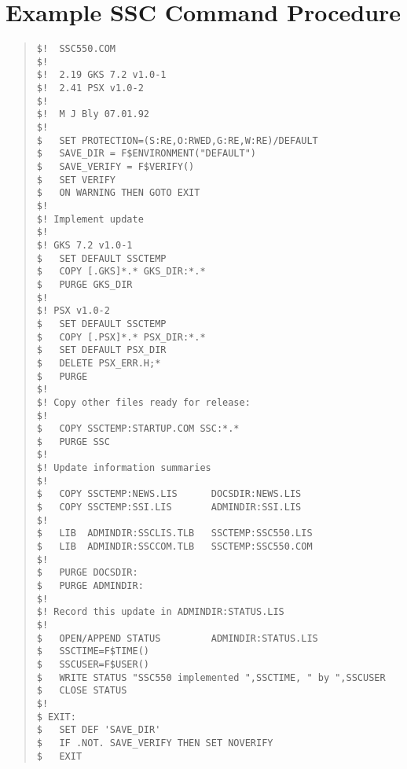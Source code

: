 \appendix

\newpage
\section {Example SSC Command Procedure}
\label{se:ex.proc}
\begin{quote}
\begin{verbatim}
$!	SSC550.COM
$!
$!	2.19 GKS 7.2 v1.0-1
$!	2.41 PSX v1.0-2
$!
$!	M J Bly 07.01.92
$!
$	SET PROTECTION=(S:RE,O:RWED,G:RE,W:RE)/DEFAULT
$	SAVE_DIR = F$ENVIRONMENT("DEFAULT")
$	SAVE_VERIFY = F$VERIFY()
$	SET VERIFY
$	ON WARNING THEN GOTO EXIT
$!
$! Implement update
$!
$! GKS 7.2 v1.0-1
$	SET DEFAULT SSCTEMP
$	COPY [.GKS]*.* GKS_DIR:*.*
$	PURGE GKS_DIR
$!
$! PSX v1.0-2
$	SET DEFAULT SSCTEMP
$	COPY [.PSX]*.* PSX_DIR:*.*
$	SET DEFAULT PSX_DIR
$	DELETE PSX_ERR.H;*
$	PURGE
$!
$! Copy other files ready for release:
$!
$	COPY SSCTEMP:STARTUP.COM SSC:*.*
$	PURGE SSC
$!
$! Update information summaries
$!
$	COPY SSCTEMP:NEWS.LIS      DOCSDIR:NEWS.LIS
$	COPY SSCTEMP:SSI.LIS       ADMINDIR:SSI.LIS
$!
$	LIB  ADMINDIR:SSCLIS.TLB   SSCTEMP:SSC550.LIS
$	LIB  ADMINDIR:SSCCOM.TLB   SSCTEMP:SSC550.COM
$!
$	PURGE DOCSDIR:
$	PURGE ADMINDIR:
$!
$! Record this update in ADMINDIR:STATUS.LIS
$!
$	OPEN/APPEND STATUS         ADMINDIR:STATUS.LIS
$	SSCTIME=F$TIME()
$	SSCUSER=F$USER()
$	WRITE STATUS "SSC550 implemented ",SSCTIME, " by ",SSCUSER
$	CLOSE STATUS
$!
$ EXIT:
$	SET DEF 'SAVE_DIR'
$	IF .NOT. SAVE_VERIFY THEN SET NOVERIFY
$	EXIT
\end{verbatim}
\end{quote}

\newpage
